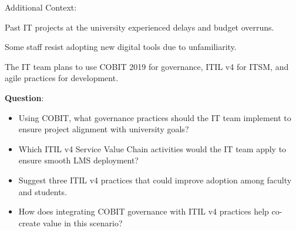 Additional Context:

Past IT projects at the university experienced delays and budget overruns.

Some staff resist adopting new digital tools due to unfamiliarity.

The IT team plans to use COBIT 2019 for governance, ITIL v4 for ITSM, and agile practices for development.

\bigskip

\noindent\textbf{Question}:

\begin{itemize}
    \item Using COBIT, what governance practices should the IT team implement to ensure project alignment with university goals?
    \item Which ITIL v4 Service Value Chain activities would the IT team apply to ensure smooth LMS deployment?
    \item Suggest three ITIL v4 practices that could improve adoption among faculty and students.
    \item How does integrating COBIT governance with ITIL v4 practices help co-create value in this scenario?
\end{itemize}


